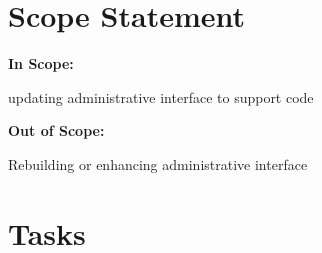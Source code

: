 \section*{Scope Statement}

{\bfseries In Scope\-:}


\begin{DoxyItemize}
\item updating administrative interface to support code
\end{DoxyItemize}

{\bfseries Out of Scope\-:}


\begin{DoxyItemize}
\item Rebuilding or enhancing administrative interface
\end{DoxyItemize}

\section*{Tasks}


